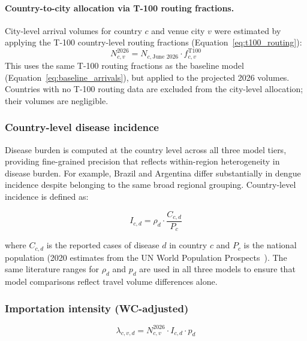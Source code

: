 \documentclass[12pt]{article}
\begin{document}
\paragraph{Country-to-city allocation via T-100 routing fractions.}
City-level arrival volumes for country $c$ and venue city $v$ were
estimated by applying the T-100 country-level routing fractions
(Equation~\ref{eq:t100_routing}):
\begin{equation}
  N_{c,v}^{2026} = N_{c,\text{June 2026}} \cdot f_{c,v}^{\text{T100}}
  \label{eq:routing_wc}
\end{equation}
This uses the same T-100 routing fractions as the baseline model
(Equation~\ref{eq:baseline_arrivals}), but applied to the projected
2026 volumes. Countries with no T-100 routing data are excluded from
the city-level allocation; their volumes are negligible.

\subsubsection*{Country-level disease incidence}

Disease burden is computed at the country level across all three
model tiers, providing fine-grained precision that reflects
within-region heterogeneity in disease burden. For example, Brazil
and Argentina differ substantially in dengue incidence despite
belonging to the same broad regional grouping. Country-level
incidence is defined as:

\begin{equation}
  I_{c,d} = \rho_d \cdot \frac{C_{c,d}}{P_c}
  \label{eq:country_inc}
\end{equation}

where $C_{c,d}$ is the reported cases of disease $d$ in country $c$
and $P_c$ is the national population (2020 estimates from the UN
World Population Prospects~\cite{PopUN2020}). The same literature ranges for $\rho_d$ and
$p_d$ are used in all three models to ensure that model comparisons
reflect travel volume differences alone.

\subsubsection*{Importation intensity (WC-adjusted)}

\begin{equation}
  \lambda_{c,v,d} = N_{c,v}^{2026} \cdot I_{c,d} \cdot p_d
  \label{eq:lambda_wc}
\end{equation}
\end{document}
